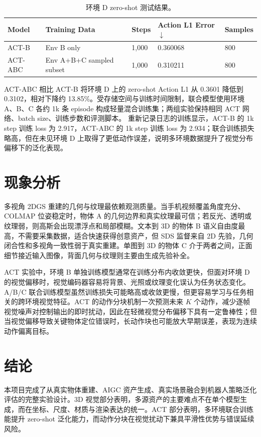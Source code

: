 \documentclass[10pt]{ctexart}
\begin{document}
\begin{table}[H]
\centering
\caption{环境 D zero-shot 测试结果。}
\begin{tabular}{lllll}
\toprule
Model & Training Data & Steps & Action L1 Error $\downarrow$ & Samples \\
\midrule
ACT-B & Env B only & 1,000 & 0.360068 & 800 \\
ACT-ABC & Env A+B+C sampled subset & 1,000 & 0.310211 & 800 \\
\bottomrule
\end{tabular}
\end{table}

ACT-ABC 相比 ACT-B 将环境 D 上的 zero-shot Action L1 从 0.3601 降低到 0.3102，相对下降约 13.85\%。受存储空间与训练时间限制，联合模型使用环境 A、B、C 各约 1k 条 episode 构成轻量混合训练集；两组实验保持相同 ACT 网络、batch size、训练步数和评测脚本。
重新记录日志的训练显示，ACT-B 的 1k step 训练 loss 为 2.917，ACT-ABC 的 1k step 训练 loss 为 2.934；联合训练损失略高，但在未见环境 D 上取得了更低动作误差，说明多环境数据提升了视觉分布偏移下的泛化表现。

\section{现象分析}
多视角 2DGS 重建的几何与纹理最依赖观测质量。当手机视频覆盖角度充分、COLMAP 位姿稳定时，物体 A 的几何边界和真实纹理最可信；若反光、透明或纹理弱，则高斯会出现漂浮点和局部模糊。文本到 3D 的物体 B 语义自由度最高，不需要采集数据，适合快速获得创意资产，但 SDS 监督来自 2D 先验，几何闭合性和多视角一致性弱于真实重建。单图到 3D 的物体 C 介于两者之间，正面细节接近输入图像，背面几何与纹理则主要由生成先验补全。

ACT 实验中，环境 B 单独训练模型通常在训练分布内收敛更快，但面对环境 D 的视觉偏移时，视觉编码器容易将背景、光照或纹理变化误认为任务状态变化。A/B/C 联合训练模型虽然训练损失可能略高或收敛更慢，但更容易学习与任务相关的跨环境视觉特征。ACT 的动作分块机制一次预测未来 $K$ 个动作，减少逐帧视觉噪声对控制输出的即时扰动，因此在轻微视觉分布偏移下具有一定鲁棒性；但当视觉偏移导致关键物体定位错误时，长动作块也可能放大早期误差，表现为连续动作偏离目标。

\section{结论}
本项目完成了从真实物体重建、AIGC 资产生成、真实场景融合到机器人策略泛化评估的完整实验设计。3D 视觉部分表明，多源资产的主要难点不在单个模型生成，而在坐标、尺度、材质与渲染表达的统一。ACT 部分表明，多环境联合训练能提升 zero-shot 泛化能力，而动作分块在视觉扰动下兼具平滑性优势与错误延续风险。
\end{document}
